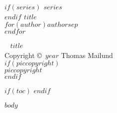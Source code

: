 \documentclass[11pt, openright, twoside, onecolumn, final]{memoir} %
\begin{document}
\frontmatter


\begingroup
\thispagestyle{empty}
{\bfseries\sffamily\noindent
$if(series)$ {\large $series$}\\[50pt]$endif$ %
{\huge $title$}\\[35pt] %
{\Large $for(author)$$author$$sep$\\$endfor$} %
}
\vfill
\endgroup



\newpage
~\vfill
\thispagestyle{empty}
{\Large $title$}\\[15pt] %
\noindent Copyright \copyright\ $year$ Thomas Mailund\\ %
$if(piccopyright)$\\[5pt]$piccopyright$\\ $endif$
\clearpage


$if(toc)$
\setcounter{tocdepth}{1}
\pagestyle{empty} %
\tableofcontents %
\cleardoublepage %
$endif$



\mainmatter
\pagestyle{plain}                %
$body$

\end{document}
